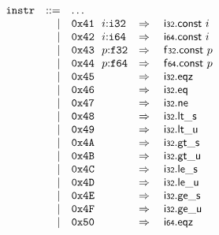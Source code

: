 $$
\begin{array}[t]{@{}lrrl@{}l@{}l@{}l@{}}
& {\mathtt{instr}} & ::= & \dots \\
& & | & \mathtt{0x41}~~i{:}{\mathtt{i32}} & \quad\Rightarrow\quad{} & \mathsf{i{\scriptstyle 32}}{.}\mathsf{const}~i \\
& & | & \mathtt{0x42}~~i{:}{\mathtt{i64}} & \quad\Rightarrow\quad{} & \mathsf{i{\scriptstyle 64}}{.}\mathsf{const}~i \\
& & | & \mathtt{0x43}~~p{:}{\mathtt{f32}} & \quad\Rightarrow\quad{} & \mathsf{f{\scriptstyle 32}}{.}\mathsf{const}~p \\
& & | & \mathtt{0x44}~~p{:}{\mathtt{f64}} & \quad\Rightarrow\quad{} & \mathsf{f{\scriptstyle 64}}{.}\mathsf{const}~p \\
& & | & \mathtt{0x45} & \quad\Rightarrow\quad{} & \mathsf{i{\scriptstyle 32}} {.} \mathsf{eqz} \\
& & | & \mathtt{0x46} & \quad\Rightarrow\quad{} & \mathsf{i{\scriptstyle 32}} {.} \mathsf{eq} \\
& & | & \mathtt{0x47} & \quad\Rightarrow\quad{} & \mathsf{i{\scriptstyle 32}} {.} \mathsf{ne} \\
& & | & \mathtt{0x48} & \quad\Rightarrow\quad{} & \mathsf{i{\scriptstyle 32}} {.} {\mathsf{lt}}{\mathsf{\_}}{\mathsf{s}} \\
& & | & \mathtt{0x49} & \quad\Rightarrow\quad{} & \mathsf{i{\scriptstyle 32}} {.} {\mathsf{lt}}{\mathsf{\_}}{\mathsf{u}} \\
& & | & \mathtt{0x4A} & \quad\Rightarrow\quad{} & \mathsf{i{\scriptstyle 32}} {.} {\mathsf{gt}}{\mathsf{\_}}{\mathsf{s}} \\
& & | & \mathtt{0x4B} & \quad\Rightarrow\quad{} & \mathsf{i{\scriptstyle 32}} {.} {\mathsf{gt}}{\mathsf{\_}}{\mathsf{u}} \\
& & | & \mathtt{0x4C} & \quad\Rightarrow\quad{} & \mathsf{i{\scriptstyle 32}} {.} {\mathsf{le}}{\mathsf{\_}}{\mathsf{s}} \\
& & | & \mathtt{0x4D} & \quad\Rightarrow\quad{} & \mathsf{i{\scriptstyle 32}} {.} {\mathsf{le}}{\mathsf{\_}}{\mathsf{u}} \\
& & | & \mathtt{0x4E} & \quad\Rightarrow\quad{} & \mathsf{i{\scriptstyle 32}} {.} {\mathsf{ge}}{\mathsf{\_}}{\mathsf{s}} \\
& & | & \mathtt{0x4F} & \quad\Rightarrow\quad{} & \mathsf{i{\scriptstyle 32}} {.} {\mathsf{ge}}{\mathsf{\_}}{\mathsf{u}} \\
& & | & \mathtt{0x50} & \quad\Rightarrow\quad{} & \mathsf{i{\scriptstyle 64}} {.} \mathsf{eqz} \\

\end{array}$$
